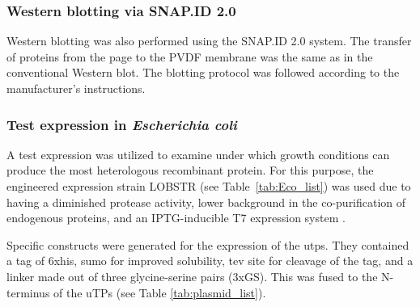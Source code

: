 \subsubsection{Western blotting via SNAP.ID 2.0} \label{txt:SNAPID}
Western blotting was also performed using the SNAP.ID 2.0 system. The transfer of proteins from the \gls{page} to the PVDF membrane was the same as in the conventional Western blot. The blotting protocol was followed according to the manufacturer's instructions.  
\subsubsection{Test expression in  \textit{Escherichia coli}} \label{txt:Testexpress}
A test expression was utilized to examine under which growth conditions  can produce the most heterologous recombinant protein. For this purpose, the engineered expression strain LOBSTR (see Table~\ref{tab:Eco_list}) was used due to having a diminished protease activity, lower background in the co-purification of endogenous proteins, and an \gls{IPTG}-inducible T7 expression system \parencite{andersen_optimized_2013, studier_use_1986}.

\par Specific constructs were generated for the expression of the \gls{utp}s. They contained a tag of \gls{6xhis}, \gls{sumo} for improved solubility, \gls{tev site} for cleavage of the tag, and a linker made out of three glycine-serine pairs (3xGS). This was fused to the N-terminus of the uTPs (see Table \ref{tab:plasmid_list}). 

